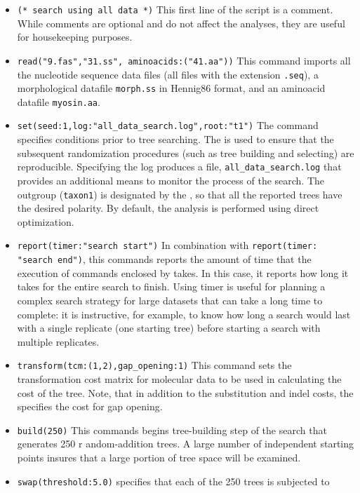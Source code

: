 \begin{itemize}
\item \texttt{(* search using all data *)} This first line of the script is a comment. While comments are optional 
and do not affect the analyses, they are useful for housekeeping purposes.
\item \texttt{read("9.fas","31.ss", aminoacids:("41.aa"))}
This command imports all the nucleotide sequence data files (all files with the extension \texttt{.seq}), a 
morphological datafile \texttt{morph.ss} in Hennig86 format, and an aminoacid datafile \texttt{myosin.aa}.
\item \texttt{set(seed:1,log:"all\_data\_search.log",root:"t1")} The  command specifies 
conditions prior to tree searching. The  is used to ensure that the subsequent 
randomization procedures (such as tree building and selecting) are reproducible. Specifying the log 
produces a file, \texttt{all\_data\_search.log} that provides an additional means to monitor the process 
of the search. The outgroup (\texttt{taxon1}) is designated by the , so that all the 
reported trees have the desired polarity. By default, the analysis is performed using direct optimization.
\item \texttt{report(timer:"search start")} In combination with \texttt{report(timer:\\"search end")}, this commands 
reports the amount of time that the execution of commands enclosed by  takes. In this 
case, it reports how long it takes for the entire search to finish. Using timer is useful for planning a complex 
search strategy for large datasets that can take a long time to complete: it is instructive, for example, to know 
how 
long a search would last with a single replicate (one starting tree) before starting a search with multiple 
replicates.
\item \texttt{transform(tcm:(1,2),gap\_opening:1)} This command sets the \\transformation cost matrix for 
molecular data to be used in calculating the cost of the tree. Note, that in addition to the substitution and 
indel costs, the  specifies the cost for gap opening.
\item \texttt{build(250)} This commands begins tree-building step of the search that generates 250 r
andom-addition trees. A large number of independent starting points insures that a large portion of tree 
space will be examined.
\item \texttt{swap(threshold:5.0)}  specifies that each of the 250 trees is subjected to 

\end{itemize}
